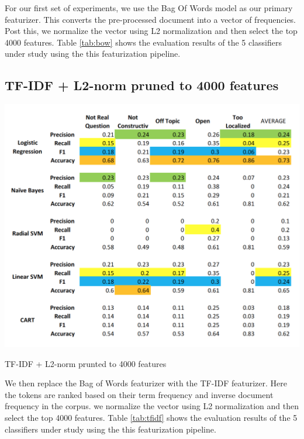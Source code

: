 \documentclass{article} %
\begin{document}
For our first set of experiments, we use the Bag Of Words model as our primary featurizer. This converts the pre-processed document into a vector of frequencies. Post this, we normalize the vector using L2 normalization and then select the top 4000 features. Table \ref{tab:bow} shows the evaluation results of the 5 classifiers under study using the this featurization pipeline.


\subsection{TF-IDF + L2-norm pruned to 4000 features}
\begin{table}[!htpb]
    \centering
    \includegraphics[scale=0.6]{figs/TFIDF}
    \caption{TF-IDF + L2-norm prunted to 4000 features}
    \label{tab:tfidf}
\end{table}
We then replace the Bag of Words featurizer with the TF-IDF featurizer. Here the tokens are ranked based on their term frequency and inverse document frequency in the corpus. we normalize the vector using L2 normalization and then select the top 4000 features. Table \ref{tab:tfidf} shows the evaluation results of the 5 classifiers under study using the this featurization pipeline.
\end{document}
